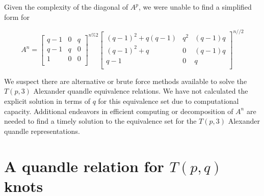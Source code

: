 \documentclass[paper.tex]{subfiles}
\begin{document}
Given the complexity of the diagonal of $A^{p}$, we were unable to find a simplified form for

\[ A^{n}
=
\left[ \begin{array}{ccc}
q-1 & 0 & q \\
q-1 & q & 0 \\
1 & 0 & 0 \\
\end{array} \right] ^{n\%2}
\left[ \begin{array}{ccc}
(q-1)^{2} + q(q-1) & q^{2} & (q-1)q \\
(q-1)^{2} + q & 0 & (q-1)q \\
q-1 & 0 & q \\
\end{array} \right] ^{n//2}
\]

We suspect there are alternative or brute force methods available to solve the $T(p,3)$ Alexander quandle equivalence relations.  We have not calculated the explicit solution in terms of $q$ for this equivalence set due to computational capacity. Additional endeavors in efficient computing or decomposition of $A^{n}$ are needed to find a timely solution to the equivalence set for the $T(p,3)$ Alexander quandle representations.


\section{A quandle relation for $T(p,q)$ knots}
\end{document}
